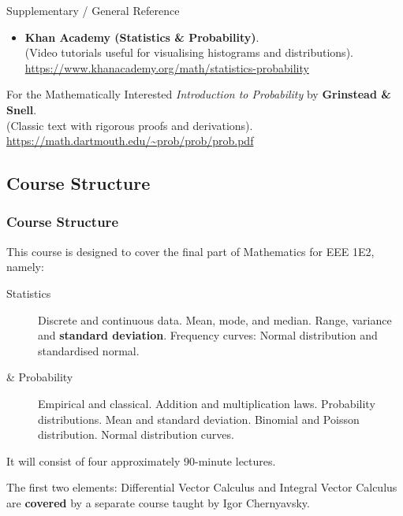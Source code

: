 \begin{frame}[allowframebreaks]
\begin{block}{Supplementary / General Reference}
\begin{itemize}
    \item \textbf{Khan Academy (Statistics \& Probability)}. \\
    (Video tutorials useful for visualising histograms and distributions). \\
    \url{https://www.khanacademy.org/math/statistics-probability}
\end{itemize}
\end{block}

\begin{block}{For the Mathematically Interested}
    \emph{Introduction to Probability} by \textbf{Grinstead \& Snell}. \\
    (Classic text with rigorous proofs and derivations). \\
    \url{https://math.dartmouth.edu/~prob/prob/prob.pdf}
\end{block}
\end{frame}

\subsection{Course Structure}
\begin{frame}
\frametitle{Course Structure}
This course is designed to cover the final part of Mathematics for EEE 1E2, namely:

\begin{description}
    \item[Statistics] Discrete and continuous data. Mean, mode, and median. Range, variance and \textbf{standard deviation}. Frequency curves: Normal distribution and standardised normal.
    \item[\& Probability] Empirical and classical. Addition and multiplication laws. Probability distributions. Mean and standard deviation. Binomial and Poisson distribution. Normal distribution curves.
\end{description}

It will consist of four approximately 90-minute lectures.


The first two elements: Differential Vector Calculus and Integral Vector Calculus are \textbf{covered} by a separate course taught by \alert{Igor Chernyavsky}.
\end{frame}


